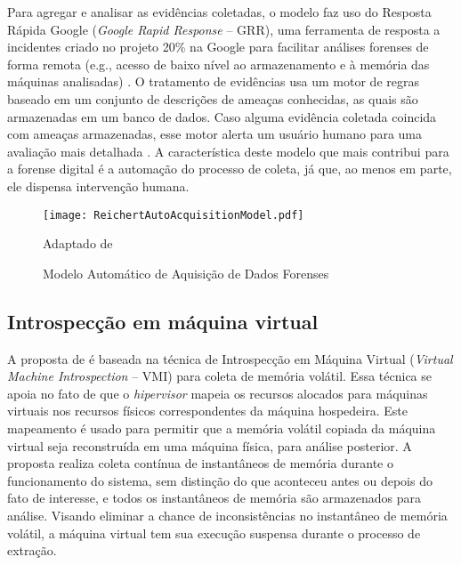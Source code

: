 Para agregar e analisar as evidências coletadas, o modelo faz uso do Resposta Rápida Google (\textit{Google Rapid Response} -- GRR), uma ferramenta de resposta a incidentes criado no projeto 20\% na Google para facilitar análises forenses de forma remota (e.g., acesso de baixo nível ao armazenamento e à memória das máquinas analisadas) \cite{GRRRapidResponse:2013}.
%
O tratamento de evidências usa um motor de regras baseado em um conjunto de descrições de ameaças conhecidas, as quais são armazenadas em um banco de dados.
%
Caso alguma evidência coletada coincida com ameaças armazenadas, esse motor alerta um usuário humano para uma avaliação mais detalhada \cite{ReichertAutoAcquisition:2015}.
%
A característica deste modelo que mais contribui para a forense digital é a automação do processo de coleta, já que, ao menos em parte, ele dispensa intervenção humana. 


%
%

\begin{figure}[htb!]
\footnotesize
\caption{Modelo Automático de Aquisição de Dados Forenses} %
\texttt{[image: ReichertAutoAcquisitionModel.pdf]}
\centering
\label{fig:ReichertAutoAcquisitionModel}
\begin{center}
Adaptado de \cite{ReichertAutoAcquisition:2015} 
\end{center}
\end{figure}


\subsection{Introspecção em máquina virtual}
\label{sec:VMI}

A proposta de \cite{PoiselVMI:2013} é baseada na técnica de Introspecção em Máquina Virtual (\textit{Virtual Machine Introspection} -- VMI) para coleta de memória volátil. 
%
Essa técnica se apoia no fato de que o \textit{hipervisor} mapeia os recursos alocados para máquinas virtuais nos recursos físicos correspondentes da máquina hospedeira.
%
Este mapeamento é usado para permitir que a memória volátil copiada da máquina virtual seja reconstruída em uma máquina física, para análise posterior.
%
A proposta realiza coleta contínua de instantâneos de memória durante o funcionamento do sistema, sem distinção do que aconteceu antes ou depois do fato de interesse, e todos os instantâneos de memória são armazenados para análise.
%
Visando eliminar a chance de inconsistências no instantâneo de memória volátil, a máquina virtual tem sua execução suspensa durante o processo de extração.


